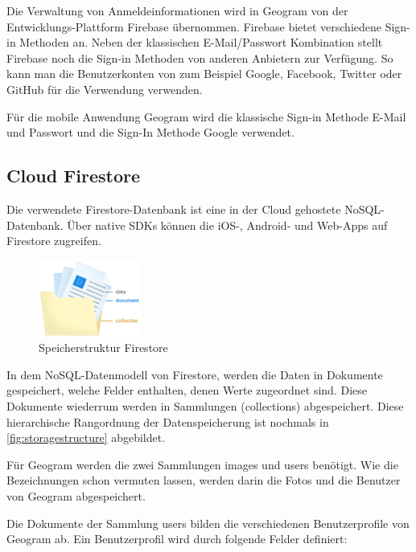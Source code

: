 Die Verwaltung von Anmeldeinformationen wird in Geogram von der Entwicklungs-Plattform Firebase übernommen. Firebase bietet verschiedene Sign-in Methoden an. Neben der klassischen E-Mail/Passwort Kombination stellt Firebase noch die Sign-in Methoden von anderen Anbietern zur Verfügung. So kann man die Benutzerkonten von zum Beispiel Google, Facebook, Twitter oder GitHub für die Verwendung verwenden.

Für die mobile Anwendung Geogram wird die klassische Sign-in Methode \glqq E-Mail und Passwort\grqq{} und die Sign-In Methode \glqq Google\grqq{} verwendet.

\subsection{Cloud Firestore\label{sup3.2.2:Unterpunkt-2}}

Die verwendete Firestore-Datenbank ist eine in der Cloud gehostete NoSQL-Datenbank. Über native SDKs können die iOS-, Android- und Web-Apps auf Firestore zugreifen.

\begin{figure}
    \begin{center}
        \includegraphics[width=0.3\textwidth]{images/firestore.png}
    \end{center}
    \caption{Speicherstruktur Firestore}
    \label{fig:storagestructure}
\end{figure}

In dem NoSQL-Datenmodell von Firestore, werden die Daten in Dokumente gespeichert, welche Felder enthalten, denen Werte zugeordnet sind. Diese Dokumente wiederrum werden in Sammlungen (collections) abgespeichert. Diese hierarchische Rangordnung der Datenspeicherung ist nochmals in \autoref{fig:storagestructure} abgebildet.

Für Geogram werden die zwei Sammlungen \glqq images\grqq{} und \glqq users\grqq{} benötigt. Wie die Bezeichnungen schon vermuten lassen, werden darin die Fotos und die Benutzer von Geogram abgespeichert.

Die Dokumente der Sammlung \glqq users\grqq{} bilden die verschiedenen Benutzerprofile von Geogram ab. Ein Benutzerprofil wird durch folgende Felder definiert:

